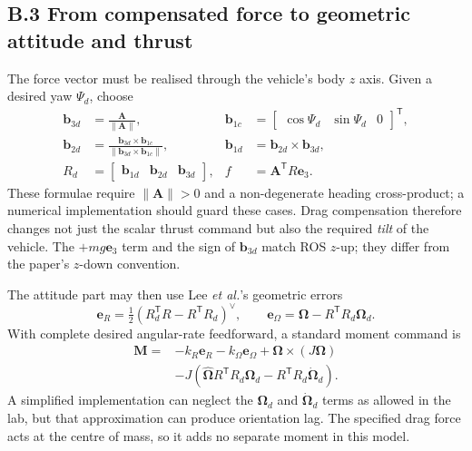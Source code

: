 \documentclass[10pt,a4paper]{article}
\newcommand{\eThree}{\mathbf e_3}
\begin{document}
\subsection*{B.3 From compensated force to geometric attitude and thrust}

The force vector must be realised through the vehicle's body $z$ axis. Given a desired yaw $\Psi_d$, choose
\begin{equation}
\begin{aligned}
\mathbf b_{3d}&=\frac{\mathbf A}{\|\mathbf A\|},&
\mathbf b_{1c}&=\begin{bmatrix}\cos\Psi_d&\sin\Psi_d&0\end{bmatrix}^{\mathsf T},\\
\mathbf b_{2d}&=\frac{\mathbf b_{3d}\times\mathbf b_{1c}}{\|\mathbf b_{3d}\times\mathbf b_{1c}\|},&
\mathbf b_{1d}&=\mathbf b_{2d}\times\mathbf b_{3d},\\
R_d&=\begin{bmatrix}\mathbf b_{1d}&\mathbf b_{2d}&\mathbf b_{3d}\end{bmatrix},&
f&=\mathbf A^\mathsf T R\eThree.
\end{aligned}
\label{eq:att}
\end{equation}
These formulae require $\|\mathbf A\|>0$ and a non-degenerate heading cross-product; a numerical implementation should guard these cases. Drag compensation therefore changes not just the scalar thrust command but also the required \emph{tilt} of the vehicle. The $+mg\eThree$ term and the sign of $\mathbf b_{3d}$ match ROS $z$-up; they differ from the paper's $z$-down convention.

The attitude part may then use Lee \emph{et al.}'s geometric errors
\begin{equation}
\mathbf e_R=\tfrac12(R_d^\mathsf T R-R^\mathsf T R_d)^\vee,
\qquad
\mathbf e_\Omega=\boldsymbol\Omega-R^\mathsf TR_d\boldsymbol\Omega_d.
\label{eq:rot_error}
\end{equation}
With complete desired angular-rate feedforward, a standard moment command is
\begin{equation}
\begin{split}
\mathbf M={}&-k_R\mathbf e_R-k_\Omega\mathbf e_\Omega
+\boldsymbol\Omega\times(J\boldsymbol\Omega)\\
&-J\!\left(\widehat{\boldsymbol\Omega}R^\mathsf TR_d\boldsymbol\Omega_d
             -R^\mathsf TR_d\dot{\boldsymbol\Omega}_d\right).
\end{split}
\label{eq:moment}
\end{equation}
A simplified implementation can neglect the $\boldsymbol\Omega_d$ and $\dot{\boldsymbol\Omega}_d$ terms as allowed in the lab, but that approximation can produce orientation lag. The specified drag force acts at the centre of mass, so it adds no separate moment in this model.
\end{document}
